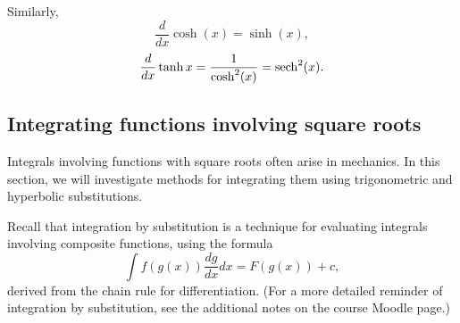 Similarly,
  \[
    \frac{d}{dx}\cosh(x) = \sinh(x),
  \]
  \[
    \frac{d}{dx}\tanh{x} = \frac{1}{\cosh^2(x)} = \operatorname{sech}^2(x).
  \]




\subsection{Integrating functions involving square roots}  \label{sect:sqrts}

Integrals involving functions with square roots often arise in mechanics.  In this section, we will investigate methods for integrating them using trigonometric and hyperbolic substitutions.

Recall that integration by substitution is a technique for evaluating integrals involving composite functions, using the formula
  \[
    \int f(g(x)) \dfrac{dg}{dx}dx = F(g(x)) + c,
  \]
derived from the chain rule for differentiation. (For a more detailed reminder of integration by substitution, see the additional notes on the course Moodle page.)


